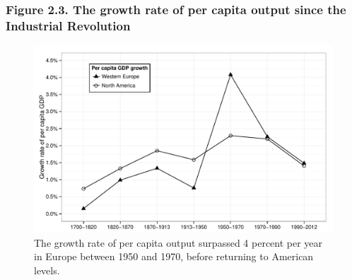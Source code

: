\documentclass[t]{beamer}\usepackage[]{graphicx}\usepackage[]{color}
\newenvironment{knitrout}{}{} %
\begin{document}
\begin{frame}[label=Figure_2_3]
\frametitle{Figure 2.3. The growth rate of per capita output since the Industrial Revolution}
\begin{figure}[t]
\begin{minipage}[b]{\textwidth}
\centering
\begin{knitrout}\footnotesize
{}\color{fgcolor}

{\centering \includegraphics[width=1\linewidth]{figures/bw/Figure_2_3} 

}



\end{knitrout}
\caption{The growth rate of per capita output surpassed 4 percent per year in Europe between 1950 and 1970, before returning to American levels.}
\end{minipage}
\end{figure}
\end{frame}
\end{document}
